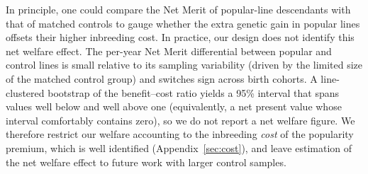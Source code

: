 \documentclass[12pt,letterpaper]{article}
\begin{document}
In principle, one could compare the Net Merit of popular-line descendants with that of matched controls to gauge whether the extra genetic gain in popular lines offsets their higher inbreeding cost. In practice, our design does not identify this net welfare effect. The per-year Net Merit differential between popular and control lines is small relative to its sampling variability (driven by the limited size of the matched control group) and switches sign across birth cohorts. A line-clustered bootstrap of the benefit--cost ratio yields a 95\% interval that spans values well below and well above one (equivalently, a net present value whose interval comfortably contains zero), so we do not report a net welfare figure. We therefore restrict our welfare accounting to the inbreeding \emph{cost} of the popularity premium, which is well identified (Appendix~\ref{sec:cost}), and leave estimation of the net welfare effect to future work with larger control samples.




\end{document}
